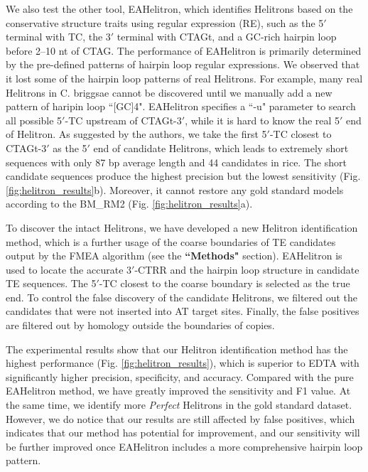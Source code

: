\documentclass{bmcart}
\begin{document}
We also test the other tool, EAHelitron, which identifies Helitrons based on the conservative structure traits using regular expression (RE), such as the 5$'$ terminal with TC, the 3$'$ terminal with CTAGt, and a GC-rich hairpin loop before 2–10 nt of CTAG. The performance of EAHelitron is primarily determined by the pre-defined patterns of hairpin loop regular expressions. We observed that it lost some of the hairpin loop patterns of real Helitrons. For example, many real Helitrons in C. briggsae cannot be discovered until we manually add a new pattern of haripin loop ``[GC]{4}". EAHelitron specifies a ``-u" parameter to search all possible 5$'$-TC upstream of CTAGt-3$'$, while it is hard to know the real 5$'$ end of Helitron. As suggested by the authors, we take the first 5$'$-TC closest to CTAGt-3$'$ as the 5$'$ end of candidate Helitrons, which leads to extremely short sequences with only 87 bp average length and 44 candidates in rice. The short candidate sequences produce the highest precision but the lowest sensitivity (Fig. \ref{fig:helitron_results}b). Moreover, it cannot restore any gold standard models according to the BM\_RM2 (Fig. \ref{fig:helitron_results}a).

To discover the intact Helitrons, we have developed a new Helitron identification method, which is a further usage of the coarse boundaries of TE candidates output by the FMEA algorithm (see the \textbf{``Methods"} section). EAHelitron is used to locate the accurate 3$'$-CTRR and the hairpin loop structure in candidate TE sequences. The 5$'$-TC closest to the coarse boundary is selected as the true end. To control the false discovery of the candidate Helitrons, we filtered out the candidates that were not inserted into AT target sites. Finally, the false positives are filtered out by homology outside the boundaries of copies.

The experimental results show that our Helitron identification method has the highest performance (Fig. \ref{fig:helitron_results}), which is superior to EDTA with significantly higher precision, specificity, and accuracy. Compared with the pure EAHelitron method, we have greatly improved the sensitivity and F1 value. At the same time, we identify more \emph{Perfect} Helitrons in the gold standard dataset. However, we do notice that our results are still affected by false positives, which indicates that our method has potential for improvement, and our sensitivity will be further improved once EAHelitron includes a more comprehensive hairpin loop pattern.
\end{document}
